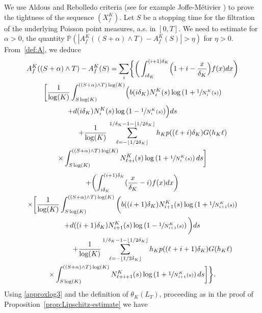\documentclass[JEP,XML,SOM,Unicode,published]{cedram}
\theoremstyle{plain}
\theoremstyle{remark}
\begin{document}
We use Aldous and Rebolledo criteria (see for example Joffe-Métivier \cite{joffemetivier}) to prove the tightness of the sequence $(X^K_f)$.
Let $S$ be a stopping time for the filtration of the underlying Poisson point measures, a.s. in $[0,T]$.
We need to estimate for $\alpha>0$, the quantity
$\mathbb{P}(|A^K_{f}((S+\alpha)\wedge T) -A^K_{f} (S)|>\eta)$ for $\eta>0$.
From~\eqref{def:A}, we deduce
\begin{multline*}
A^K_{f}((S+\alpha)\wedge T) -A^K_{f} (S) =
 \sum_{i} \biggl\{\bigg(\int_{i\delta_{K}}^{(i+1)\delta_{K}} \Bigl(1+i -{x\over \delta_{K}}\Bigr)f(x)dx \biggr) \\
\bigg[
\frac{1}{\log(K)}\int_{S \log(K)}^{((S+\alpha)\wedge T)\log(K)}\Bigl(b(i \delta_{K})N^K_{i}(s)\log\left(1+\sfrac{1}{N^K_{i}(s)}\right)\\
\hspace*{-1cm}+ d(i \delta_{K})N^K_{i}(s)\log\left(1-\sfrac{1}{N^K_{i}(s)}\right)\Bigr) ds
\\
\hspace*{2cm}+{\frac{1}{\log(K)}}\, \sum_{\ell=-\lfloor 1/2\delta_K\rfloor}^{1/\delta_K-1-\lfloor 1/2\delta_K\rfloor}h_Kp((\ell+i)\delta_K)G(h_K\ell)\\
\times\int_{S \log(K)}^{((S+\alpha)\wedge T)\log(K)} N^K_{\ell+i}(s)\log\left(1+\sfrac{1}{N^K_{i}(s)}\right) ds\bigg]
\end{multline*}%
\vspace*{-1.5\baselineskip}
\begin{multline*}
+ \biggl(\int_{i\delta_{K}}^{(i+1)\delta_{K}} ({x\over \delta_{K}}-i) f(x)dx\biggr)\\
\times \bigg[
\frac{1}{\log(K)}\int_{S \log(K)}^{((S+\alpha)\wedge T)\log(K)}\bigg(b((i+1) \delta_{K})N^K_{i+1}(s)\log\left(1+\sfrac{1}{N^K_{i+1}(s)}\right)\\
+ d((i +1) \delta_{K})N^K_{i+1}(s)\log\left(1-\sfrac{1}{N^K_{i+1}(s)}\right)\bigg) ds \\
\hspace*{2cm} +{\frac{1}{\log(K)}} \sum_{\ell=-\lfloor 1/2\delta_K\rfloor}^{1/\delta_K-1-\lfloor 1/2\delta_K\rfloor}h_Kp((\ell+i+1)\delta_K)G(h_K\ell)
\\
\times \int_{S \log(K)}^{((S+\alpha)\wedge T)\log(K)} N^K_{\ell+i+1}(s)\log\left(1+\sfrac{1}{N^K_{i+1}(s)}\right) ds\bigg]\bigg\}.
\end{multline*}
Using \eqref{approxlog3} and the definition of $\theta_K(L_T)$, proceeding as in the proof of Proposition~\ref{prop:Lipschitz-estimate} we have
\end{document}
